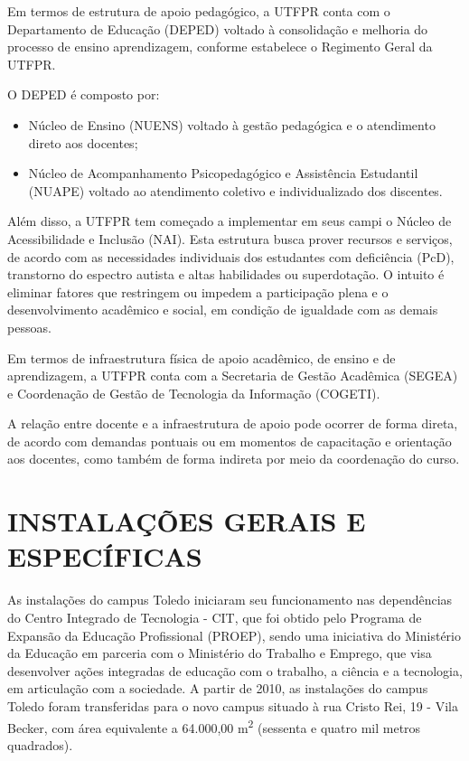 Em termos de estrutura de apoio pedagógico, a UTFPR conta com o Departamento de Educação (DEPED) voltado à consolidação e melhoria do processo de ensino aprendizagem, conforme estabelece o Regimento Geral da UTFPR.

O DEPED é composto por:

\begin{itemize}
    \item Núcleo de Ensino (NUENS) voltado à gestão pedagógica e o atendimento direto aos docentes;
    \item Núcleo de Acompanhamento Psicopedagógico e Assistência Estudantil (NUAPE) voltado ao atendimento coletivo e individualizado dos discentes.
\end{itemize}

Além disso, a UTFPR tem começado a implementar em seus campi o Núcleo de Acessibilidade e Inclusão (NAI). Esta estrutura busca prover recursos e serviços, de acordo com as necessidades individuais dos estudantes com deficiência (PcD), transtorno do espectro autista e altas habilidades ou superdotação. O intuito é eliminar fatores que restringem ou impedem a participação plena e o desenvolvimento acadêmico e social, em condição de igualdade com as demais pessoas.

Em termos de infraestrutura física de apoio acadêmico, de ensino e de aprendizagem, a UTFPR conta com a Secretaria de Gestão Acadêmica (SEGEA) e Coordenação de Gestão de Tecnologia da Informação (COGETI).

A relação entre docente e a infraestrutura de apoio pode ocorrer de forma direta, de acordo com demandas pontuais ou em momentos de capacitação e orientação aos docentes, como também de forma indireta por meio da coordenação do curso.


\section{INSTALAÇÕES GERAIS E ESPECÍFICAS}

As instalações do campus Toledo iniciaram seu funcionamento nas dependências do Centro Integrado de Tecnologia - CIT, que foi obtido pelo Programa de Expansão da Educação Profissional (PROEP), sendo uma iniciativa do Ministério da Educação em parceria com o Ministério do Trabalho e Emprego, que visa desenvolver ações integradas de educação com o trabalho, a ciência e a tecnologia, em articulação com a sociedade. A partir de 2010, as instalações do campus Toledo foram transferidas para o novo campus situado à rua Cristo Rei, 19 - Vila Becker, com área equivalente a 64.000,00 m\textsuperscript{2} (sessenta e quatro mil metros quadrados).

